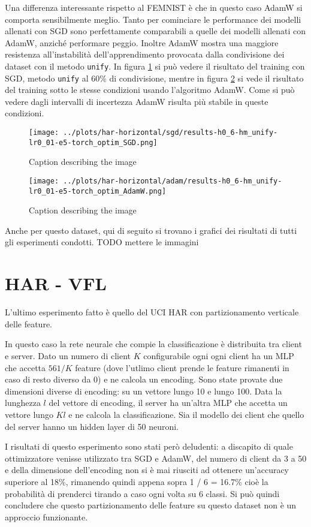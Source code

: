 Una differenza interessante rispetto al FEMNIST è che in questo 
caso AdamW si comporta sensibilmente meglio. Tanto per cominciare
le performance dei modelli allenati con SGD sono perfettamente 
comparabili a quelle dei modelli allenati con AdamW, anziché 
performare peggio. Inoltre AdamW mostra una maggiore resistenza 
all'instabilità dell'apprendimento provocata dalla condivisione 
dei dataset con il metodo \texttt{unify}. In figura 
\ref{fig:haru6sgd} si può vedere il risultato del training con SGD,
metodo \texttt{unify} al 60\% di condivisione, mentre in figura 
\ref{fig:haru6adam} si vede il risultato del training sotto le 
stesse condizioni usando l'algoritmo AdamW. Come si può vedere 
dagli intervalli di incertezza AdamW risulta più stabile in 
queste condizioni.
\begin{figure}[htbp]  %
    \centering
    \texttt{[image: ../plots/har-horizontal/sgd/results-h0\_6-hm\_unify-lr0\_01-e5-torch\_optim\_SGD.png]}
    \caption{Caption describing the image}
    \label{fig:haru6sgd}
\end{figure}
\begin{figure}[htbp]  %
    \centering
    \texttt{[image: ../plots/har-horizontal/adam/results-h0\_6-hm\_unify-lr0\_01-e5-torch\_optim\_AdamW.png]}
    \caption{Caption describing the image}
    \label{fig:haru6adam}
\end{figure}

Anche per questo dataset, qui di seguito si trovano i grafici dei
risultati di tutti gli esperimenti condotti.
TODO mettere le immagini


\section{HAR - VFL}
L'ultimo esperimento fatto è quello del UCI HAR con partizionamento 
verticale delle feature.

In questo caso la rete neurale che compie la classificazione è 
distribuita tra client e server. Dato un numero di client \(K\) 
configurabile ogni ogni client ha un MLP che accetta \(561 / K\)
feature (dove l'utlimo client prende le feature rimanenti in caso di 
resto diverso da 0) e ne calcola un encoding. Sono state provate due 
dimensioni diverse di encoding: su un vettore lungo 10 e lungo 100.
Data la lunghezza \(l\) del vettore di encoding, il server ha un'altra 
MLP che accetta un vettore lungo \(Kl\) e ne calcola la classificazione.
Sia il modello dei client che quello del server hanno un hidden layer 
di 50 neuroni.

I risultati di questo esperimento sono stati però deludenti: a discapito
di quale ottimizzatore venisse utilizzato tra SGD e AdamW, del numero di client da 
3 a 50 e della dimensione dell'encoding non si è mai riusciti ad ottenere 
un'accuracy superiore al 18\%, rimanendo quindi appena sopra
1 / 6 = 16.7\% cioè la probabilità di prenderci tirando a caso ogni 
volta su 6 classi. Si può quindi concludere che questo partizionamento
delle feature su questo dataset non è un approccio funzionante.